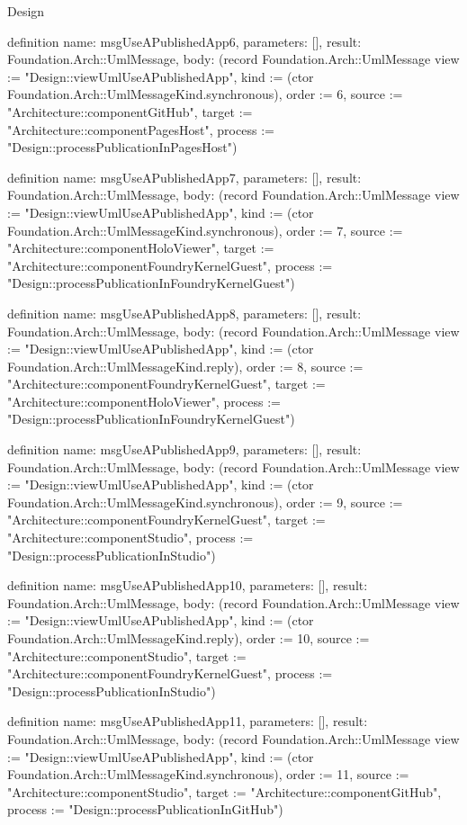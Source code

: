 \begin{lexlean}{Design}
\begin{semanticmodule}
definition{
  name: msgUseAPublishedApp6,
  parameters: [],
  result: Foundation.Arch::UmlMessage,
  body: (record Foundation.Arch::UmlMessage {view := "Design::viewUmlUseAPublishedApp", kind := (ctor Foundation.Arch::UmlMessageKind.synchronous), order := 6, source := "Architecture::componentGitHub", target := "Architecture::componentPagesHost", process := "Design::processPublicationInPagesHost"})
}

definition{
  name: msgUseAPublishedApp7,
  parameters: [],
  result: Foundation.Arch::UmlMessage,
  body: (record Foundation.Arch::UmlMessage {view := "Design::viewUmlUseAPublishedApp", kind := (ctor Foundation.Arch::UmlMessageKind.synchronous), order := 7, source := "Architecture::componentHoloViewer", target := "Architecture::componentFoundryKernelGuest", process := "Design::processPublicationInFoundryKernelGuest"})
}

definition{
  name: msgUseAPublishedApp8,
  parameters: [],
  result: Foundation.Arch::UmlMessage,
  body: (record Foundation.Arch::UmlMessage {view := "Design::viewUmlUseAPublishedApp", kind := (ctor Foundation.Arch::UmlMessageKind.reply), order := 8, source := "Architecture::componentFoundryKernelGuest", target := "Architecture::componentHoloViewer", process := "Design::processPublicationInFoundryKernelGuest"})
}

definition{
  name: msgUseAPublishedApp9,
  parameters: [],
  result: Foundation.Arch::UmlMessage,
  body: (record Foundation.Arch::UmlMessage {view := "Design::viewUmlUseAPublishedApp", kind := (ctor Foundation.Arch::UmlMessageKind.synchronous), order := 9, source := "Architecture::componentFoundryKernelGuest", target := "Architecture::componentStudio", process := "Design::processPublicationInStudio"})
}

definition{
  name: msgUseAPublishedApp10,
  parameters: [],
  result: Foundation.Arch::UmlMessage,
  body: (record Foundation.Arch::UmlMessage {view := "Design::viewUmlUseAPublishedApp", kind := (ctor Foundation.Arch::UmlMessageKind.reply), order := 10, source := "Architecture::componentStudio", target := "Architecture::componentFoundryKernelGuest", process := "Design::processPublicationInStudio"})
}

definition{
  name: msgUseAPublishedApp11,
  parameters: [],
  result: Foundation.Arch::UmlMessage,
  body: (record Foundation.Arch::UmlMessage {view := "Design::viewUmlUseAPublishedApp", kind := (ctor Foundation.Arch::UmlMessageKind.synchronous), order := 11, source := "Architecture::componentStudio", target := "Architecture::componentGitHub", process := "Design::processPublicationInGitHub"})
}


\end{semanticmodule}
\end{lexlean}
